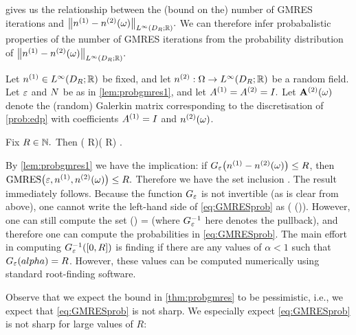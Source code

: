  gives us the relationship between the (bound on the) number of GMRES iterations and $\NLiDRRR{\nso-\nst(\omega)}.$ We can therefore infer probabalistic properties of the number of GMRES iterations from the probability distribution of $\NLiDRRR{\nso-\nst(\omega)}.$



\label{thm:probgmres}
Let $\nso \in \LiDRRR$ be fixed, and let $\nst:\Omega\rightarrow\LiDRRR$ be a random field. Let $\varepsilon$ and $N$ be as in \cref{lem:probgmres1}, and let ${A}^{(1)} = {A}^{(2)} = I.$ Let $\mathbf{A}^{(2)}(\omega)$ denote the (random) Galerkin matrix corresponding to the discretisation of \cref{prob:edp} with coefficients ${A}^{(1)}=I$ and ${n}^{(2)}(\omega)$.

Fix $ R \in \mathbb N.$ Then
\beq\label{eq:GMRESprob}
\PP\mleft(\Gfn{\NLiDRRR{\nso-\nst}} \leq R\mright)\leq\PP\mleft(\GMRES{\eps}{\nso}{\nst} \leq R\mright) .
\eeq
\enth

By \cref{lem:probgmres1} we have the implication: if $\Gfn{\nso-\nst(\omega)} \leq R$, then $\GMRES{\eps}{\nso}{\nst(\omega)} \leq R.$ Therefore we have the set inclusion
\beqs
{} \subseteq {}.
\eeqs
The result immediately follows.
\epf
{}
Because the function $G_{\varepsilon}$ is not invertible (as is clear from  above), one cannot write the left-hand side of \cref{eq:GMRESprob} as
\beqs
\PP\mleft(\NLiDRRR{\nso-\nst} \leq \GfnnameI\mleft(\mleft[0,R\mright]\mright)\mright).
\eeqs
However, one can still compute the set
\beqs
\GfnnameI\mleft(\mleft[0,R\mright]\mright) = \set{\alpha \st \Gfn{\alpha} \in \mleft[0,R\mright]}
\eeqs
(where $G_{\varepsilon}^{-1}$ here denotes the pullback), and therefore one can compute the probabilities in \cref{eq:GMRESprob}. The main effort in computing $\GfnI{\mleft[0,R\mright]}$ is finding if there are any values of $\alpha < 1$ such that $\Gfn{alpha} = R$. However, these values can be computed numerically using standard root-finding software.
\ere

\label{rem:pessimistic}
Observe that we expect the bound in \cref{thm:probgmres} to be pessimistic, i.e., we expect that \cref{eq:GMRESprob} is not sharp. We especially expect \cref{eq:GMRESprob} is not sharp for large values of $R:$

